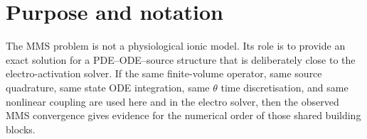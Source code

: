 \documentclass[11pt,a4paper]{article}
\newcommand{\Mmass}{\mathbf{M}}
\newcommand{\Kstif}{\mathbf{K}}
\begin{document}
\begin{abstract}
 The sparse-matrix assemblies of $\Mmass$ and $\Kstif$ are split into
\emph{chunks} over cells/faces to bound the transient triplet-vector peak on
large 3D unstructured meshes. The current implementation also exposes an
automatic memory-optimisation mode with adaptive stiffness triplet reservation,
compact consistent-mass assembly, conditional allocation of ionic
quadrature-point fields, and allocator trimming around the large setup phases.
The results section is data driven: tables are generated from the current
tutorial outputs and fitted directly from the aggregated 
files.
\end{abstract}

\tableofcontents
\bigskip

\section{Purpose and notation}

The MMS problem is not a physiological ionic model. Its role is to provide an
exact solution for a PDE--ODE--source structure that is deliberately close to
the electro-activation solver. If the same finite-volume operator, same source
quadrature, same state ODE integration, same $\theta$ time discretisation, and
same nonlinear coupling are used here and in the electro solver, then the
observed MMS convergence gives evidence for the numerical order of those shared
building blocks.
\end{document}
